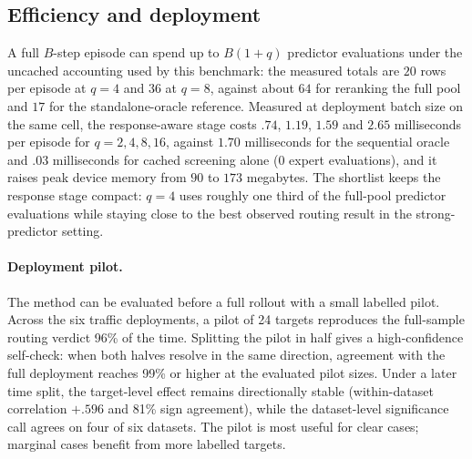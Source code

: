 \subsection{Efficiency and deployment}

A full $B$-step episode can spend up to $B(1+q)$ predictor evaluations under
the uncached accounting used by this benchmark: the measured totals are $20$
rows per episode at $q=4$ and $36$ at $q=8$, against about $64$ for reranking
the full pool and $17$ for the standalone-oracle reference. Measured at deployment batch size on the same cell,
the response-aware stage costs $.74$, $1.19$, $1.59$ and $2.65$ milliseconds
per episode for $q=2,4,8,16$, against $1.70$ milliseconds for the sequential
oracle and $.03$ milliseconds for cached screening alone
($0$ expert evaluations), and it raises peak device memory from $90$ to
$173$ megabytes. The shortlist keeps the response stage compact: $q=4$ uses roughly one third
of the full-pool predictor evaluations while staying close to the best observed
routing result in the strong-predictor setting.

\paragraph{Deployment pilot.}
The method can be evaluated before a full rollout with a small labelled pilot.
Across the six traffic deployments, a pilot of 24 targets reproduces the
full-sample routing verdict 96\% of the time. Splitting the pilot in half gives
a high-confidence self-check: when both halves resolve in the same direction,
agreement with the full deployment reaches 99\% or higher at the evaluated
pilot sizes. Under a later time split, the target-level effect remains
directionally stable (within-dataset correlation $+.596$ and 81\% sign
agreement), while the dataset-level significance call agrees on four of six
datasets. The pilot is most useful for clear cases; marginal cases benefit from more
labelled targets.
